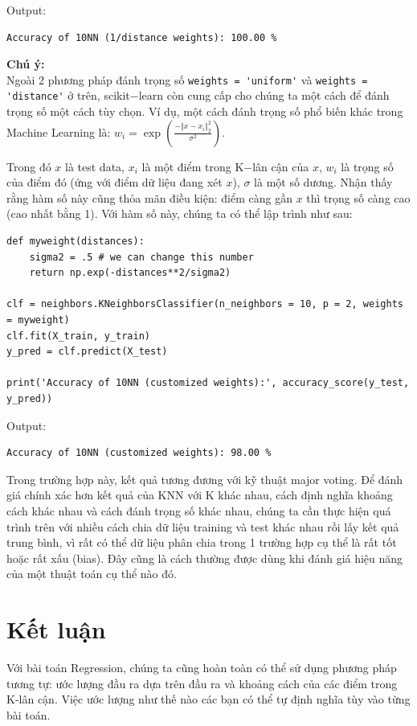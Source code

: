 \documentclass{article}
\begin{document}
Output:

\begin{lstlisting}
Accuracy of 10NN (1/distance weights): 100.00 %
\end{lstlisting}

\textbf{Chú ý:}
\\

Ngoài 2 phương pháp đánh trọng số \lstinline{weights = 'uniform'} và \lstinline{weights = 'distance'} ở trên, scikit$-$learn còn cung cấp cho chúng ta một cách để đánh trọng số một cách tùy chọn. Ví dụ, một cách đánh trọng số phổ biến khác trong Machine Learning là: $w_i = \exp(\frac{-\Vert x - x_i \Vert_2^2}{\sigma^2})$.

Trong đó $x$ là test data, $x_i$ là một điểm trong K$-$lân cận của $x$, $w_i$ là trọng số của điểm đó (ứng với điểm dữ liệu đang xét $x$), $\sigma$ là một số dương. Nhận thấy rằng hàm số này cũng thỏa mãn điều kiện: điểm càng gần $x$ thì trọng số càng cao (cao nhất bằng 1). Với hàm số này, chúng ta có thể lập trình như sau:

\begin{lstlisting}
def myweight(distances):
    sigma2 = .5 # we can change this number
    return np.exp(-distances**2/sigma2)

clf = neighbors.KNeighborsClassifier(n_neighbors = 10, p = 2, weights = myweight)
clf.fit(X_train, y_train)
y_pred = clf.predict(X_test)

print('Accuracy of 10NN (customized weights):', accuracy_score(y_test, y_pred))
\end{lstlisting}

Output:

\begin{lstlisting}
Accuracy of 10NN (customized weights): 98.00 %
\end{lstlisting}

Trong trường hợp này, kết quả tương đương với kỹ thuật major voting. Để đánh giá chính xác hơn kết quả của KNN với K khác nhau, cách định nghĩa khoảng cách khác nhau và cách đánh trọng số khác nhau, chúng ta cần thực hiện quá trình trên với nhiều cách chia dữ liệu training và test khác nhau rồi lấy kết quả trung bình, vì rất có thể dữ liệu phân chia trong 1 trường hợp cụ thể là rất tốt hoặc rất xấu (bias). Đây cũng là cách thường được dùng khi đánh giá hiệu năng của một thuật toán cụ thể nào đó.

\section{Kết luận}
Với bài toán Regression, chúng ta cũng hoàn toàn có thể sử dụng phương pháp tương tự: ước lượng đầu ra dựa trên đầu ra và khoảng cách của các điểm trong K-lân cận. Việc ước lượng như thế nào các bạn có thể tự định nghĩa tùy vào từng bài toán.
\end{document}
